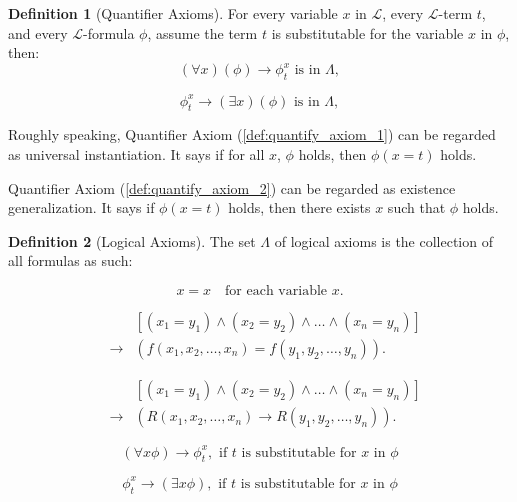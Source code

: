 \documentclass[11pt,letterpaper]{book}
\theoremstyle{definition}
\newtheorem{definition}{Definition}[section]
\begin{document}
\begin{definition}[Quantifier Axioms] For every variable $x$ in
$\mathcal{L}$, every $\mathcal{L}$-term $t$, and every
$\mathcal{L}$-formula $\phi$, assume the term $t$ is substitutable for
the variable $x$ in $\phi$, then:
\begin{equation}\label{def:quantify_axiom_1}
(\forall x)( \phi) \rightarrow \phi_t ^{x} \text{ is in } \Lambda, \tag{Q1}
\end{equation}


\begin{equation}\label{def:quantify_axiom_2}
\phi_t ^{x} \rightarrow (\exists x)( \phi) \text{ is in } \Lambda, \tag{Q2}
\end{equation}

\end{definition}


Roughly speaking, Quantifier Axiom (\ref{def:quantify_axiom_1}) can be
regarded as universal instantiation. It says if for all $x$, $\phi$
holds, then $\phi(x=t)$ holds.

Quantifier Axiom
(\ref{def:quantify_axiom_2}) can be regarded as existence
generalization. It says if $\phi(x=t)$ holds, then there exists $x$ such
that $\phi$ holds.


\begin{definition}[Logical Axioms]

The set $\Lambda$ of logical axioms is the collection of all formulas as
such:

\begin{equation}
x=x \quad \text{for each variable } x. \tag{E1}
\end{equation}

\begin{equation}
\begin{aligned}
& & [(x_1 = y_1) \land (x_2=y_2) \land \ldots \land (x_n=y_n) ]  \\
& \rightarrow & ( f(x_1, x_2, \ldots, x_n) = f(y_1, y_2, \ldots, y_n) ).
\end{aligned}\tag{E2}
\end{equation}

\begin{equation}
\begin{aligned}
& & [(x_1 = y_1) \land (x_2=y_2) \land \ldots \land (x_n=y_n) ]  \\
& \rightarrow & ( R(x_1, x_2, \ldots, x_n) \rightarrow R(y_1, y_2,
\ldots, y_n) ).
\end{aligned}\tag{E3}
\end{equation}

\begin{equation}
(\forall x \phi) \rightarrow \phi_t ^{x}, \text{ if } t \text{ is
substitutable for } x \text{ in } \phi \tag{Q1}
\end{equation}

\begin{equation}
\phi_t ^{x} \rightarrow (\exists x \phi), \text{ if } t \text{ is
substitutable for } x \text{ in } \phi \tag{Q2}
\end{equation}

\end{definition}
\end{document}
